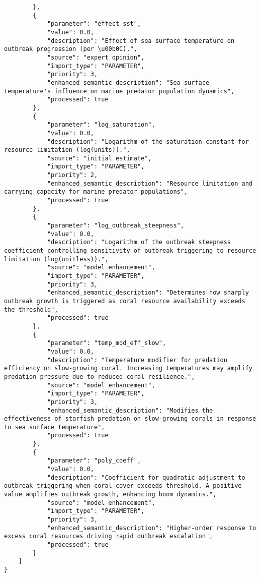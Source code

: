 \begin{lstlisting}
        },
        {
            "parameter": "effect_sst",
            "value": 0.0,
            "description": "Effect of sea surface temperature on outbreak progression (per \u00b0C).",
            "source": "expert opinion",
            "import_type": "PARAMETER",
            "priority": 3,
            "enhanced_semantic_description": "Sea surface temperature's influence on marine predator population dynamics",
            "processed": true
        },
        {
            "parameter": "log_saturation",
            "value": 0.0,
            "description": "Logarithm of the saturation constant for resource limitation (log(units)).",
            "source": "initial estimate",
            "import_type": "PARAMETER",
            "priority": 2,
            "enhanced_semantic_description": "Resource limitation and carrying capacity for marine predator populations",
            "processed": true
        },
        {
            "parameter": "log_outbreak_steepness",
            "value": 0.0,
            "description": "Logarithm of the outbreak steepness coefficient controlling sensitivity of outbreak triggering to resource limitation (log(unitless)).",
            "source": "model enhancement",
            "import_type": "PARAMETER",
            "priority": 3,
            "enhanced_semantic_description": "Determines how sharply outbreak growth is triggered as coral resource availability exceeds the threshold",
            "processed": true
        },
        {
            "parameter": "temp_mod_eff_slow",
            "value": 0.0,
            "description": "Temperature modifier for predation efficiency on slow-growing coral. Increasing temperatures may amplify predation pressure due to reduced coral resilience.",
            "source": "model enhancement",
            "import_type": "PARAMETER",
            "priority": 3,
            "enhanced_semantic_description": "Modifies the effectiveness of starfish predation on slow-growing corals in response to sea surface temperature",
            "processed": true
        },
        {
            "parameter": "poly_coeff",
            "value": 0.0,
            "description": "Coefficient for quadratic adjustment to outbreak triggering when coral cover exceeds threshold. A positive value amplifies outbreak growth, enhancing boom dynamics.",
            "source": "model enhancement",
            "import_type": "PARAMETER",
            "priority": 3,
            "enhanced_semantic_description": "Higher-order response to excess coral resources driving rapid outbreak escalation",
            "processed": true
        }
    ]
}
\end{lstlisting}
\clearpage
